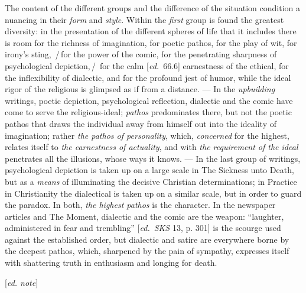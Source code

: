 \documentclass[12pt,a4paper,openany]{book}
\newcommand{\kpage}[1]{\marginnote{\footnotesize\textit{[#1]}}}
\newcommand{\ed}[1]{{\small[\textit{ed.}\ #1]}}
\newcommand{\ednote}[1]{{\small[\textit{ed. note}]}}
\newcommand{\ins}[1]{\,/\,#1\,/\,}
\begin{document}
The content of the different groups and the difference of the situation
condition a nuancing in their \emph{form} and \emph{style}. Within the
\emph{first} group is found the greatest diversity: in the presentation of the
different spheres of life that it includes there is room for the richness of
imagination, for poetic pathos, for the play of wit, for irony's\kpage{106}
sting, \ins{for the power of the comic, for the penetrating sharpness of
psychological depiction,} for the calm \ed{66.6} earnestness of the ethical, for
the inflexibility of dialectic, and for the profound jest of humor, while the
ideal rigor of the religious is glimpsed as if from a distance. --- In the
\emph{upbuilding} writings, poetic depiction, psychological reflection,
dialectic and the comic have come to serve the religious-ideal; \emph{pathos}
predominates there, but not the poetic pathos that draws the individual away
from himself out into the ideality of imagination; rather \emph{the pathos of
personality}, which, \emph{concerned} for the highest, relates itself to
\emph{the earnestness of actuality}, and with \emph{the requirement of the
ideal} penetrates all the illusions, whose ways it knows. --- In the last group
of writings, psychological depiction is taken up on a large scale in The
Sickness unto Death, but as a \emph{means} of illuminating the decisive
Christian determinations; in Practice in Christianity the dialectical is taken
up on a similar scale, but in order to guard the paradox. In both, \emph{the
highest pathos} is the character. In the newspaper articles and The Moment,
dialectic and the comic are the weapon: ``laughter, administered in fear and
trembling'' \ed{\emph{SKS} 13, p. 301} is the scourge used against the
established order, but dialectic and satire are everywhere borne by the deepest
pathos, which, sharpened by the pain of sympathy, expresses itself with
shattering truth in enthusiasm and longing for death.

\ednote{}
\end{document}
